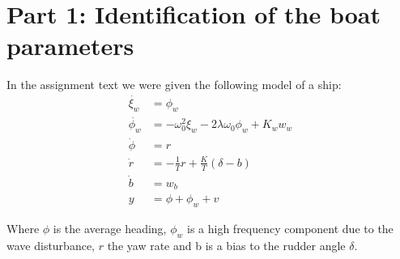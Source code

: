 \section{Part 1: Identification of the boat  parameters}

In the assignment text we were given the following model of a ship:
\begin{subequations}
		\begin{align}
				\dot{\xi_w} &= \phi_w\\
				\dot{\phi_w} &= -\omega_0^2\xi_w-2\lambda\omega_0\phi_w+K_ww_w\\
				\dot{\phi} &= r\\
				\dot{r} &= -\frac{1}{T}r+\frac{K}{T}(\delta-b)\\
				\dot{b} &= w_b\\
				y &= \phi + \phi_w + v
		\end{align}
\end{subequations}

Where $\phi$ is the average heading, $\phi_w$ is a high frequency component due to the wave disturbance, $r$ the yaw rate and b is a bias to the rudder angle $\delta$.